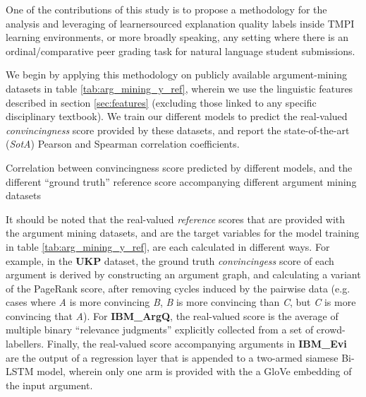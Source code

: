 \documentclass[notitlepage,12pt]{jedm}
\begin{document}
One of the contributions of this study is to propose a methodology for the 
analysis and leveraging of learnersourced explanation quality labels inside 
TMPI learning environments, or more broadly speaking, any setting where there 
is an ordinal/comparative peer grading task for natural language student 
submissions.

We begin by applying this methodology on publicly available argument-mining 
datasets in table \ref{tab:arg_mining_y_ref}, wherein we use the linguistic 
features described in section \ref{sec:features} (excluding those linked to any 
specific disciplinary textbook).
We train our different models to predict the real-valued 
\textit{convincingness} score provided by these datasets, and report the 
state-of-the-art (\textit{SotA}) Pearson and Spearman correlation coefficients.

\begin{table}
	\parbox{.45\linewidth}{
		\centering
		
	}
	\hfill
	\parbox{.45\linewidth}{
		\centering
		
	}
\caption{Correlation between convincingness score predicted by 
	different models, and the different ``ground truth'' reference score 
	accompanying different argument mining datasets}
\label{tab:arg_mining_y_ref}
\end{table}

It should be noted that the real-valued \textit{reference} scores that are 
provided with the argument mining datasets, and are the target variables for 
the model training in table \ref{tab:arg_mining_y_ref}, are each 
calculated in different ways. 
For example, in the \textbf{UKP} dataset, the ground truth 
\textit{convincingess} score of each argument is derived by 
constructing an argument graph, and calculating a variant of the PageRank 
score, after removing cycles induced by the pairwise data (e.g. cases where 
\textit{A} is more convincing \textit{B}, \textit{B} is more convincing than 
\textit{C}, but \textit{C} is more convincing that \textit{A}).
For \textbf{IBM\_ArgQ}, the real-valued score is the average of multiple binary 
``relevance judgments'' explicitly collected from a set of crowd-labellers.
Finally, the real-valued score accompanying arguments in \textbf{IBM\_Evi} are 
the output of a regression layer that is appended to a two-armed siamese 
Bi-LSTM model, wherein only one arm is provided with the a GloVe embedding of 
the input argument.
\end{document}
